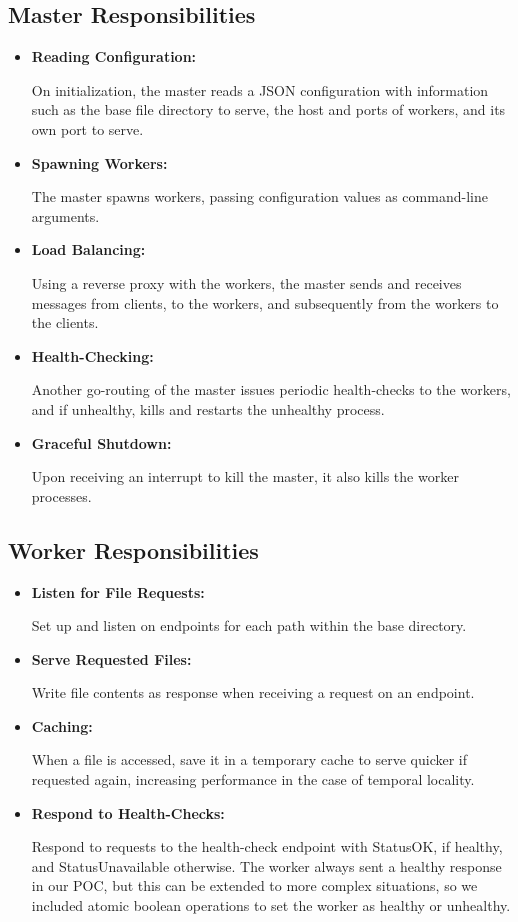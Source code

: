\documentclass[10pt]{article}
\begin{document}
\begin{multicols}{2}
\subsection*{Master Responsibilities}
\begin{itemize}
\item 
\textbf{Reading Configuration:}
\par
On initialization, the master reads a JSON configuration with information such as the base file directory to serve, the host and ports of workers, and its own port to serve.
\item
\textbf{Spawning Workers:}
\par
The master spawns workers, passing configuration values as command-line arguments.
\item
\textbf{Load Balancing:}
\par
Using a reverse proxy with the workers, the master sends and receives messages from clients, to the workers, and subsequently from the workers to the clients.
\item
\textbf{Health-Checking:}
\par
Another go-routing of the master issues periodic health-checks to the workers, and if unhealthy, kills and restarts the unhealthy process.
\item
\textbf{Graceful Shutdown:}
\par
Upon receiving an interrupt to kill the master, it also kills the worker processes.
\end{itemize}
\subsection*{Worker Responsibilities}
\begin{itemize}
\item
\textbf{Listen for File Requests:}
\par
Set up and listen on endpoints for each path within the base directory.
\item
\textbf{Serve Requested Files:}
\par
Write file contents as response when receiving a request on an endpoint.
\item
\textbf{Caching:}
\par
When a file is accessed, save it in a temporary cache to serve quicker if requested again, increasing performance in the case of temporal locality.
\item
\textbf{Respond to Health-Checks:}
\par
Respond to requests to the health-check endpoint with StatusOK, if healthy, and StatusUnavailable otherwise. The worker always sent a healthy response in our POC, but this can be extended to more complex situations, so we included atomic boolean operations to set the worker as healthy or unhealthy.
\end{itemize}
\end{multicols}
\end{document}
